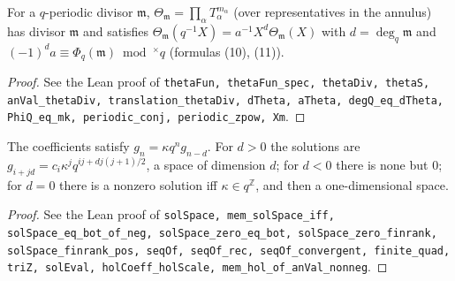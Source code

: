 \begin{proposition}
\label{prop:theta-divisor}
\leanok
For a $q$-periodic divisor $\mathfrak m$, $\Theta_{\mathfrak m}=\prod_\alpha T_\alpha^{m_\alpha}$ (over representatives in the annulus) has divisor $\mathfrak m$ and satisfies $\Theta_{\mathfrak m}(q^{-1}X)=a^{-1}X^d\Theta_{\mathfrak m}(X)$ with $d=\deg_q\mathfrak m$ and $(-1)^da\equiv\Phi_q(\mathfrak m)\bmod^\times q$ (formulas (10), (11)).
\end{proposition}
\begin{proof}
\leanok
See the Lean proof of \texttt{thetaFun, thetaFun\_spec, thetaDiv, thetaS, anVal\_thetaDiv, translation\_thetaDiv, dTheta, aTheta, degQ\_eq\_dTheta, PhiQ\_eq\_mk, periodic\_conj, periodic\_zpow, Xm}.
\end{proof}

\begin{proposition}[Holomorphic solutions of $G(q^{-1}X)=\kappa X^dG(X)$]
\label{prop:periodic-solutions}
\leanok
The coefficients satisfy $g_n=\kappa q^ng_{n-d}$. For $d>0$ the solutions are $g_{i+jd}=c_i\kappa^jq^{ij+dj(j+1)/2}$, a space of dimension $d$; for $d<0$ there is none but $0$; for $d=0$ there is a nonzero solution iff $\kappa\in q^{\mathbb Z}$, and then a one-dimensional space.
\end{proposition}
\begin{proof}
\leanok
See the Lean proof of \texttt{solSpace, mem\_solSpace\_iff, solSpace\_eq\_bot\_of\_neg, solSpace\_zero\_eq\_bot, solSpace\_zero\_finrank, solSpace\_finrank\_pos, seqOf, seqOf\_rec, seqOf\_convergent, finite\_quad, triZ, solEval, holCoeff\_holScale, mem\_hol\_of\_anVal\_nonneg}.
\end{proof}

